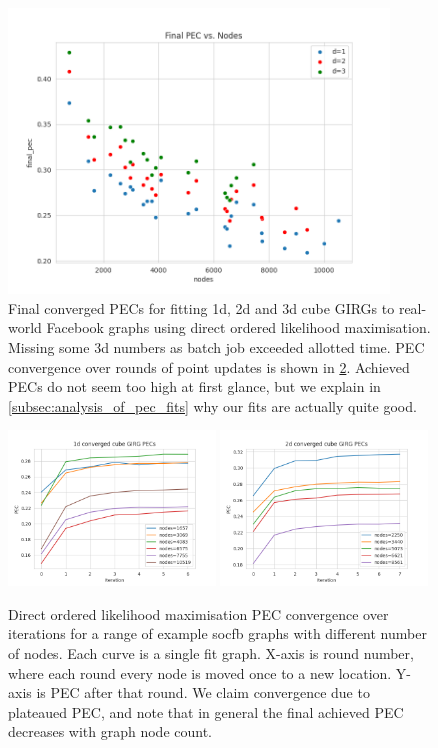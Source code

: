 \begin{figure}
  \centering
  \includegraphics[width=0.9\textwidth]{figures/mcmc_ordered_final_pec.png}
  \caption{Final converged PECs for fitting 1d, 2d and 3d cube GIRGs to real-world Facebook graphs using direct ordered likelihood maximisation.
  Missing some 3d numbers as batch job exceeded allotted time.
  PEC convergence over rounds of point updates is shown in \cref{fig:direct_ordered_pec_convergence_curves}. Achieved PECs do not seem too high at first glance, but we explain in \cref{subsec:analysis_of_pec_fits} why our fits are actually quite good.}
  \label{fig:converged_pecs}
\end{figure}


\begin{figure}
  \centering
  \includegraphics[width=0.49\textwidth]{figures/mcmc_ordered_1d_pec_convergence.png}
  \includegraphics[width=0.49\textwidth]{figures/mcmc_ordered_2d_pec_convergence.png}
  \caption{Direct ordered likelihood maximisation PEC convergence over iterations for a range of example socfb graphs with different number of nodes. Each curve is a single fit graph. X-axis is round number, where each round every node is moved once to a new location. Y-axis is PEC after that round. We claim convergence due to plateaued PEC, and note that in general the final achieved PEC decreases with graph node count.}
  \label{fig:direct_ordered_pec_convergence_curves}
\end{figure}


